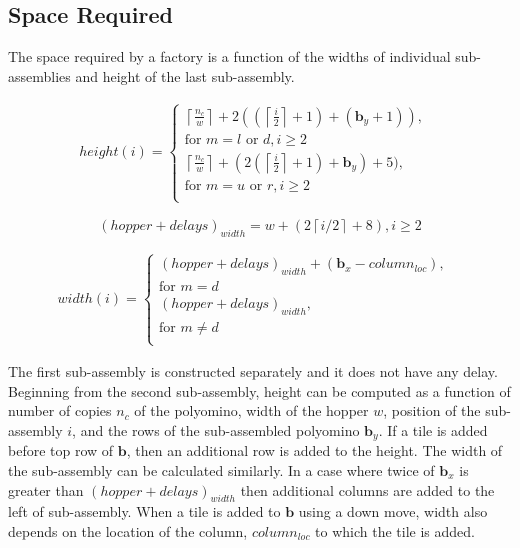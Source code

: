 \subsection{Space Required}\label{sec:requiredSpace}
The space required by a factory is a function of the widths of individual sub-assemblies and height of the last sub-assembly.

\begin{align}
height(i)=
\begin{cases}
\left \lceil{   \frac{n_c}{w}}\right \rceil+2((\left \lceil{\frac{i}{2}}\right \rceil+1)+(\mathbf{b}_y+1)),&\\ 
\text{for } m = l \text{ or } d, i \geq 2&\\
\left \lceil{   \frac{n_c}{w}}\right \rceil+(2(\left \lceil{\frac{i}{2}}\right \rceil+1)+\mathbf{b}_y)+5),&\\ 
\text{for } m = u \text{ or } r, i \geq 2&\\
\end{cases}
\end{align}



\begin{equation}
(hopper+delays)_{width}=w+(2\left \lceil{i/2}\right \rceil+8),  i \geq 2
\end{equation}

\begin{align}
width(i)=
\begin{cases}
(hopper+delays)_{width}+(\mathbf{b}_x-column_{loc}),&\\ 
\text{for } m = d &\\
(hopper+delays)_{width},&\\ 
\text{for } m \neq d &\\
\end{cases}
\end{align}

The first sub-assembly is constructed separately and it does not have any delay.
Beginning from the second sub-assembly, height can be computed as a function of number of copies $n_c$ of the polyomino, width of the hopper $w$, position of the sub-assembly $i$, and the rows of the sub-assembled polyomino $\mathbf{b}_y$. If a tile is added before top row of $\mathbf{b}$, then an additional row is added to the height.
The width of the sub-assembly can be calculated similarly. 
In a case where twice of $\mathbf{b}_x$ is greater than $(hopper+delays)_{width}$ then additional columns are added to the left of sub-assembly. 
When a tile is added to $\mathbf{b}$ using a down move, width also depends on the location of the column, $column_{loc}$ to which the tile is added.  
  

